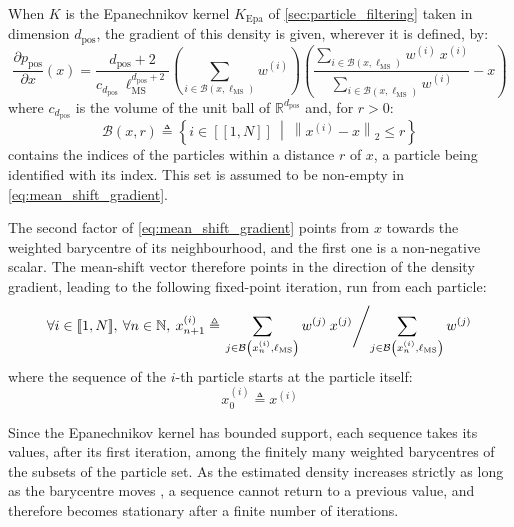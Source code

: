 When $K$ is the Epanechnikov kernel $K_{\mathrm{Epa}}$ of \cref{sec:particle_filtering} taken in dimension $d_{\mathrm{pos}}$, the gradient of this density is given, wherever it is defined, by:
\begin{equation}
	\frac{\partial p_{\mathrm{pos}}}{\partial x}(x)=\frac{d_{\mathrm{pos}}+2}{c_{d_{\mathrm{pos}}}\:\ell_{\mathrm{MS}}^{d_{\mathrm{pos}}+2}}\left(\sum_{i\in\mathcal{B}(x,\ell_{\mathrm{MS}})}w^{(i)}\right)\left(\frac{\displaystyle\sum_{i\in\mathcal{B}(x,\ell_{\mathrm{MS}})}w^{(i)}\:x^{(i)}}{\displaystyle\sum_{i\in\mathcal{B}(x,\ell_{\mathrm{MS}})}w^{(i)}}-x\right)\label{eq:mean_shift_gradient}
\end{equation}
where $c_{d_{\mathrm{pos}}}$ is the volume of the unit ball of $\mathbb{R}^{d_{\mathrm{pos}}}$ and, for $r>0$:
\begin{equation}
	\mathcal{B}(x,r)\triangleq\left\{i\in[\![1,N]\!]\:\middle|\:\left\|x^{(i)}-x\right\|_2\leq r\right\}
\end{equation}
contains the indices of the particles within a distance $r$ of $x$, a particle being identified with its index. This set is assumed to be non-empty in \eqref{eq:mean_shift_gradient}.

The second factor of \eqref{eq:mean_shift_gradient} points from $x$ towards the weighted barycentre of its neighbourhood, and the first one is a non-negative scalar. The mean-shift vector therefore points in the direction of the density gradient, leading to the following fixed-point iteration, run from each particle:
\begin{equation}
	\forall i\in[\![1,N]\!],\:\forall n\in\mathbb{N},\:x_{n+1}^{(i)}\triangleq\left.\sum_{j\in\mathcal{B}\left(x_{n}^{(i)},\ell_{\mathrm{MS}}\right)}w^{(j)}\:x^{(j)}\middle/\sum_{j\in\mathcal{B}\left(x_{n}^{(i)},\ell_{\mathrm{MS}}\right)}w^{(j)}\right.\label{eq:MS_fixed_point}
\end{equation}
where the sequence of the $i$-th particle starts at the particle itself:
\begin{equation}
	x_0^{(i)}\triangleq x^{(i)}
\end{equation}

Since the Epanechnikov kernel has bounded support, each sequence takes its values, after its first iteration, among the finitely many weighted barycentres of the subsets of the particle set. As the estimated density increases strictly as long as the barycentre moves \cite{bib:mean-shift-clustering}, a sequence cannot return to a previous value, and therefore becomes stationary after a finite number of iterations.

